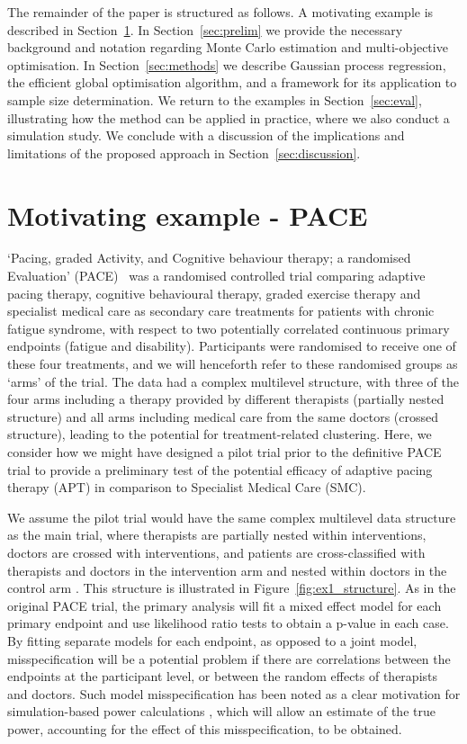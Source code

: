 \documentclass[sagev, Crown]{sagej}
\begin{document}
The remainder of the paper is structured as follows. A motivating example is described in Section~\ref{sec:ex}. In Section~\ref{sec:prelim} we provide the necessary background and notation regarding Monte Carlo estimation and multi-objective optimisation. In Section~\ref{sec:methods} we describe Gaussian process regression, the efficient global optimisation algorithm, and a framework for its application to sample size determination. We return to the examples in Section~\ref{sec:eval}, illustrating how the method can be applied in practice, where we also conduct a simulation study. We conclude with a discussion of the implications and limitations of the proposed approach in Section~\ref{sec:discussion}.

\section{Motivating example - PACE}\label{sec:ex}

`Pacing, graded Activity, and Cognitive behaviour therapy; a randomised Evaluation' (PACE)~\cite{White2007, White2011} was a randomised controlled trial comparing adaptive pacing therapy, cognitive behavioural therapy, graded exercise therapy and specialist medical care as secondary care treatments for patients with chronic fatigue syndrome, with respect to two potentially correlated continuous primary endpoints (fatigue and disability). Participants were randomised to receive one of these four treatments, and we will henceforth refer to these randomised groups as `arms' of the trial. The data had a complex multilevel structure, with three of the four arms including a therapy provided by different therapists (partially nested structure) and all arms including medical care from the same doctors (crossed structure), leading to the potential for treatment-related clustering. Here, we consider how we might have designed a pilot trial prior to the definitive PACE trial to provide a preliminary test of the potential efficacy of adaptive pacing therapy (APT) in comparison to Specialist Medical Care (SMC). 

We assume the pilot trial would have the same complex multilevel data structure as the main trial, where therapists are partially nested within interventions, doctors are crossed with interventions, and patients are cross-classified with therapists and doctors in the intervention arm and nested within doctors in the control arm \cite{Walwyn2010}. This structure is illustrated in Figure~\ref{fig:ex1_structure}. As in the original PACE trial, the primary analysis will fit a mixed effect model for each primary endpoint and use likelihood ratio tests to obtain a p-value in each case. By fitting separate models for each endpoint, as opposed to a joint model, misspecification will be a potential problem if there are correlations between the endpoints at the participant level, or between the random effects of therapists and doctors. Such model misspecification has been noted as a clear motivation for simulation-based power calculations \cite{Landau2013}, which will allow an estimate of the true power, accounting for the effect of this misspecification, to be obtained.
\end{document}
